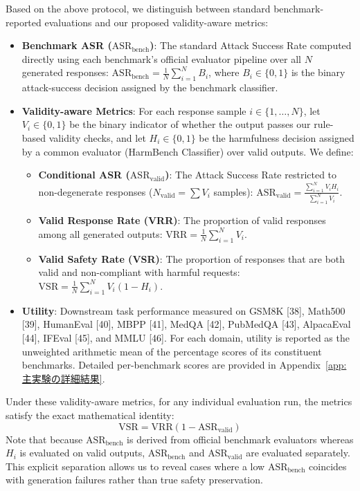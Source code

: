 \documentclass{article}
\begin{document}
Based on the above protocol, we distinguish between standard benchmark-reported evaluations and our proposed validity-aware metrics:

\begin{itemize}
    \item \textbf{Benchmark ASR ($\mathrm{ASR}_{\mathrm{bench}}$)}: The standard Attack Success Rate computed directly using each benchmark's official evaluator pipeline over all $N$ generated responses: $\mathrm{ASR}_{\mathrm{bench}} = \frac{1}{N}\sum_{i=1}^N B_i$, where $B_i \in \{0,1\}$ is the binary attack-success decision assigned by the benchmark classifier.
    
    \item \textbf{Validity-aware Metrics}: For each response sample $i \in \{1,\dots,N\}$, let $V_i \in \{0,1\}$ be the binary indicator of whether the output passes our rule-based validity checks, and let $H_i \in \{0,1\}$ be the harmfulness decision assigned by a common evaluator (HarmBench Classifier) over valid outputs. We define:
    \begin{itemize}
        \item \textbf{Conditional ASR ($\mathrm{ASR}_{\mathrm{valid}}$)}: The Attack Success Rate restricted to non-degenerate responses ($N_{\mathrm{valid}} = \sum V_i$ samples): $\mathrm{ASR}_{\mathrm{valid}} = \frac{\sum_{i=1}^N V_i H_i}{\sum_{i=1}^N V_i}$.
        \item \textbf{Valid Response Rate (VRR)}: The proportion of valid responses among all generated outputs: $\mathrm{VRR} = \frac{1}{N}\sum_{i=1}^N V_i$.
        \item \textbf{Valid Safety Rate (VSR)}: The proportion of responses that are both valid and non-compliant with harmful requests: $\mathrm{VSR} = \frac{1}{N}\sum_{i=1}^N V_i(1-H_i)$.
    \end{itemize}
    \item \textbf{Utility}: Downstream task performance measured on GSM8K [38], Math500 [39], HumanEval [40], MBPP [41], MedQA [42], PubMedQA [43], AlpacaEval [44], IFEval [45], and MMLU [46]. For each domain, utility is reported as the unweighted arithmetic mean of the percentage scores of its constituent benchmarks. Detailed per-benchmark scores are provided in Appendix~\ref{app:主実験の詳細結果}.
\end{itemize}

Under these validity-aware metrics, for any individual evaluation run, the metrics satisfy the exact mathematical identity:
\[
\mathrm{VSR} = \mathrm{VRR}\left(1-\mathrm{ASR}_{\mathrm{valid}}\right)
\]
Note that because $\mathrm{ASR}_{\mathrm{bench}}$ is derived from official benchmark evaluators whereas $H_i$ is evaluated on valid outputs, $\mathrm{ASR}_{\mathrm{bench}}$ and $\mathrm{ASR}_{\mathrm{valid}}$ are evaluated separately. This explicit separation allows us to reveal cases where a low $\mathrm{ASR}_{\mathrm{bench}}$ coincides with generation failures rather than true safety preservation.
\end{document}

